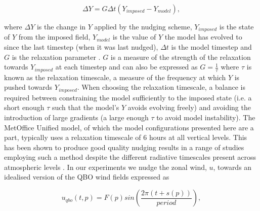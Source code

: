 \begin{equation} \label{eq:nudging}
\Delta Y = G \Delta t (Y_{imposed} - Y_{model}), 
\end{equation}

\noindent where $\Delta Y$ is the change in $Y$ applied by the nudging scheme, $Y_{imposed}$ is the state of $Y$ from the imposed field, $Y_{model}$ is the value of $Y$ the model has evolved to since the last timestep (when it was last nudged), $\Delta t$ is the model timestep and $G$ is the relaxation parameter \citep{telfordTechnical2008}. $G$ is a measure of the strength of the relaxation towards $Y_{imposed}$ at each timestep and can also be expressed as $G = \frac{1}{\tau}$ where $\tau$ is known as the relaxation timescale, a measure of the frequency at which $Y$ is pushed towards $Y_{imposed}$. When choosing the relaxation timescale, a balance is required between constraining the model sufficiently to the imposed state (i.e. a short enough $\tau$ such that the model's $Y$ avoids evolving freely) and avoiding the introduction of large gradients (a large enough $\tau$ to avoid model instability). The MetOffice Unified model, of which the model configurations presented here are a part, typically uses a relaxation timescale of 6 hours at all vertical levels. This has been shown to produce good quality nudging results in a range of studies employing such a method despite the different radiative timescales present across atmospheric levels \citep{grayForecasting2020a}. In our experiments we nudge the zonal wind, $u$, towards an idealised version of the QBO wind fields expressed as 

\begin{equation} \label{eq:imposed_U}
u_{qbo}(t, p) = F(p) sin(\frac{2\pi (t + s(p))}{period}),
\end{equation}

